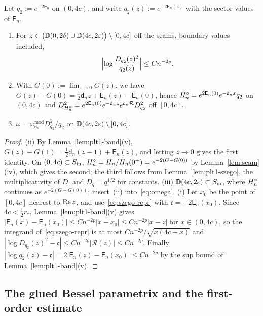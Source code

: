 \begin{lemma}\label{lem:plt1-weight}
Let $q_2:=e^{-2\mathsf E_n}$ on $(0,4c)$, and write $q_2(z):=e^{-2\mathsf E_n(z)}$ with the sector values of $\mathsf E_n$.
\begin{enumerate}
\item[(i)] For $z\in\bigl(\mathbb D(0,2\delta)\cup\mathbb D(4c,2\varepsilon)\bigr)\setminus[0,4c]$ off the seams, boundary values
  included,
  \begin{equation}\label{eq:plt1-q2}
    \Bigl|\log\frac{D_{q_2}(z)^2}{q_2(z)}\Bigr|\le Cn^{-2p}.
  \end{equation}
\item[(ii)] With $G(0):=\lim_{z\to0}G(z)$, we have $G(z)-G(0)=\frac12\mathsf d_nz+\mathsf E_n(z)-\mathsf E_n(0)$, hence
  $H^{\circ}_n=e^{2\mathsf E_n(0)}e^{-\mathsf d_nx}q_2$ on $(0,4c)$ and $D_{H^{\circ}_n}^2=e^{2\mathsf E_n(0)}e^{-\mathsf d_nz}e^{\mathsf d_n\mathcal R}D_{q_2}^2$
  off $[0,4c]$.
\item[(iii)] $\omega=\omega^{\mathrm{mod}}_{\mathsf d_n}D_{q_2}^2/q_2$ on $\mathbb D(4c,2\varepsilon)\setminus[0,4c]$.
\end{enumerate}
\end{lemma}

\begin{proof}
(ii) By Lemma~\ref{lem:plt1-band}(v), $G(z)-G(1)=\frac12\mathsf d_n(z-1)+\mathsf E_n(z)$, and letting $z\to0$ gives the first
identity. On $(0,4c)\subset S_{\mathrm{in}}$, $H^{\circ}_n=H_n/H_n(0^+)=e^{-2(G-G(0))}$ by Lemma~\ref{lem:seam}(iv), which gives the second;
the third follows from Lemma~\ref{lem:plt1-szego}, the multiplicativity of $D$, and $D_q=q^{1/2}$ for constants.
(iii) $\mathbb D(4c,2\varepsilon)\subset S_{\mathrm{in}}$, where $H^{\circ}_n$ continues as $e^{-2(G-G(0))}$; insert~(ii) into~\eqref{eq:omega}.
(i) Let $x_0$ be the point of $[0,4c]$ nearest to $\operatorname{Re} z$, and use~\eqref{eq:szego-repr} with
$\mathfrak c=-2\mathsf E_n(x_0)$. Since $4c<\frac12r_*$, Lemma~\ref{lem:plt1-band}(v) gives
$|\mathsf E_n(x)-\mathsf E_n(x_0)|\le Cn^{-2p}|x-x_0|\le Cn^{-2p}|x-z|$ for $x\in(0,4c)$, so the integrand
of~\eqref{eq:szego-repr} is at most $Cn^{-2p}/\sqrt{x(4c-x)}$ and $|\log D_{q_2}(z)^2-\mathfrak c|\le Cn^{-2p}|\mathcal R(z)|\le
Cn^{-2p}$. Finally $|\log q_2(z)-\mathfrak c|=2|\mathsf E_n(z)-\mathsf E_n(x_0)|\le Cn^{-2p}$ by the sup bound of
Lemma~\ref{lem:plt1-band}(v).
\end{proof}

\subsection{The glued Bessel parametrix and the first-order estimate}\label{sec:plt1-param}

